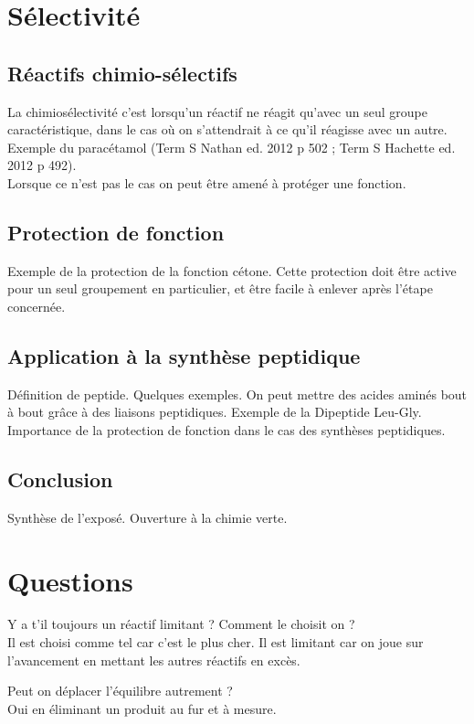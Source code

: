 \documentclass[12pt,prb,aps,epsf]{article}
\begin{document}
\section{Sélectivité}
\subsection{Réactifs chimio-sélectifs}
La chimiosélectivité c'est lorsqu'un réactif ne réagit qu'avec un seul groupe caractéristique, dans le cas où on s'attendrait à ce qu'il réagisse avec un autre. Exemple du paracétamol (Term S Nathan ed. 2012 p 502 ; Term S
Hachette ed. 2012 p 492).\\
Lorsque ce n'est pas le cas on peut être amené à protéger une fonction.

\subsection{Protection de fonction}
Exemple de la protection de la fonction cétone. Cette protection doit être active pour un seul groupement en particulier, et être facile à enlever après l'étape concernée.

\subsection{Application à la synthèse peptidique}
Définition de peptide. Quelques exemples. On peut mettre des acides aminés bout à bout grâce à des liaisons peptidiques. Exemple de la Dipeptide Leu-Gly.\\

Importance de la protection de fonction dans le cas des synthèses peptidiques.

\subsection*{Conclusion}
Synthèse de l'exposé. Ouverture à la chimie verte.

\section*{Questions}
Y a t'il toujours un réactif limitant ? Comment le choisit on ?\\
Il est choisi comme tel car c'est le plus cher. Il est limitant car on joue sur l'avancement en mettant les autres réactifs en excès. 

Peut on déplacer l'équilibre autrement ?\\
Oui en éliminant un produit au fur et à mesure.\\
\end{document}
